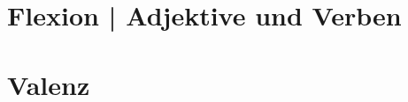 \documentclass[handout,aspectratio=1610,dvipsnames]{beamer}
\begin{document}
  \section{Flexion | Adjektive und Verben}
  \let\woopsi\section\let\section\subsection\let\subsection\subsubsection
  
  \let\subsection\section\let\section\woopsi
  
  \section{Valenz}
  \let\woopsi\section\let\section\subsection\let\subsection\subsubsection
  
  \let\subsection\section\let\section\woopsi
  
\end{document}
